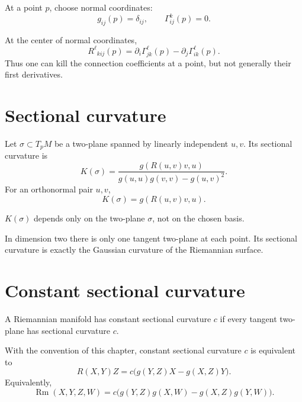 At a point \(p\), choose normal coordinates:
\[
g_{ij}(p)=\delta_{ij},
\qquad
\Gamma^k_{ij}(p)=0.
\]

\begin{proposition}\label{prop:vii26-normal}
At the center of normal coordinates,
\[
R^\ell{}_{kij}(p)
=
\partial_i\Gamma^\ell_{jk}(p)
-
\partial_j\Gamma^\ell_{ik}(p).
\]
Thus one can kill the connection coefficients at a point, but not generally their
first derivatives.
\end{proposition}

\section{Sectional curvature}

\begin{definition}\label{def:vii26-sectional}
Let \(\sigma\subset T_pM\) be a two-plane spanned by linearly independent
\(u,v\). Its sectional curvature is
\[
K(\sigma)
=
\frac{g(R(u,v)v,u)}
{g(u,u)g(v,v)-g(u,v)^2}.
\]
For an orthonormal pair \(u,v\),
\[
K(\sigma)=g(R(u,v)v,u).
\]
\end{definition}

\begin{proposition}\label{prop:vii26-sectional-well}
\(K(\sigma)\) depends only on the two-plane \(\sigma\), not on the chosen basis.
\end{proposition}

\begin{remark}
In dimension two there is only one tangent two-plane at each point.  Its sectional
curvature is exactly the Gaussian curvature of the Riemannian surface.
\end{remark}

\section{Constant sectional curvature}

\begin{definition}\label{def:vii26-space-form}
A Riemannian manifold has constant sectional curvature \(c\) if every tangent
two-plane has sectional curvature \(c\).
\end{definition}

\begin{theorem}\label{thm:vii26-space-form-r}
With the convention of this chapter, constant sectional curvature \(c\) is
equivalent to
\[
R(X,Y)Z
=
c\bigl(g(Y,Z)X-g(X,Z)Y\bigr).
\]
Equivalently,
\[
\operatorname{Rm}(X,Y,Z,W)
=
c\bigl(g(Y,Z)g(X,W)-g(X,Z)g(Y,W)\bigr).
\]
\end{theorem}

